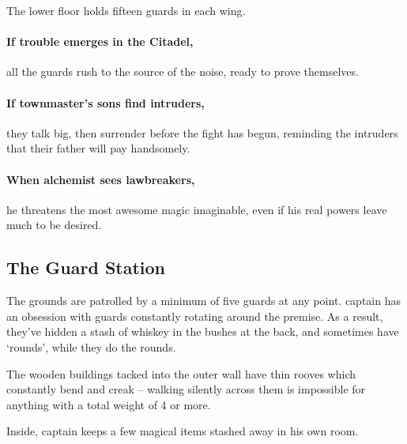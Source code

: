 \begin{multicols}{2}
\begin{enumerate}
\end{enumerate}

The lower floor holds fifteen guards in each wing.


\paragraph{If trouble emerges in the Citadel,}
all the guards rush to the source of the noise, ready to prove themselves.


\paragraph{If \gls{townmaster}'s sons find intruders,}
they talk big, then surrender before the fight has begun, reminding the intruders that their father will pay handsomely.

\citadelAlchemist

\label{citadel_alchemist}

\paragraph{When \gls{alchemist} sees lawbreakers,}
he threatens the most awesome magic imaginable, even if his real powers leave much to be desired.

\townmaster

\subsection{The Guard Station}\label{guardstation}
The grounds are patrolled by a minimum of five guards at any point.
\Gls{captain} has an obsession with guards constantly rotating around the premise.
As a result, they've hidden a stash of whiskey in the bushes at the back, and sometimes have `rounds', while they do the rounds.

The wooden buildings tacked into the outer wall have thin rooves which constantly bend and creak -- walking silently across them is impossible for anything with a total weight of 4 or more.

Inside, \gls{captain} keeps a few magical items stashed away in his own room.



\end{multicols}
